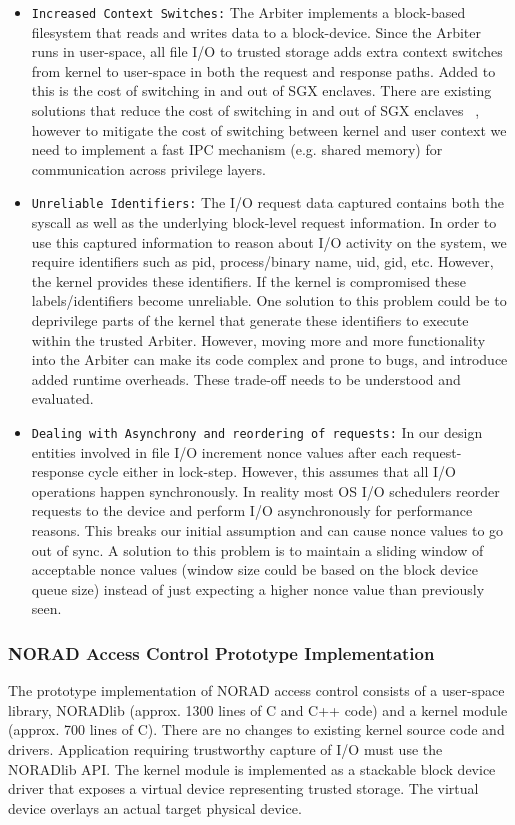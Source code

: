 \documentclass[withindex,glossary]{cam-thesis}
\begin{document}
\begin{itemize}

\item \texttt{Increased Context Switches:}
The Arbiter implements a block-based filesystem that reads and writes data to a block-device.
Since the Arbiter runs in user-space, all file I/O to trusted storage adds extra context switches from kernel to user-space in both the request and response paths.
Added to this is the cost of switching in and out of SGX enclaves.
There are existing solutions that reduce the cost of switching in and out of SGX enclaves ~\cite{hotcalls, eleos}, however to mitigate the cost of switching between kernel and user context we need to implement a fast IPC mechanism (e.g. shared memory) for communication across privilege layers.

\item \texttt{Unreliable Identifiers:}
The I/O request data captured contains both the syscall as well as the underlying block-level request information.
In order to use this captured information to reason about I/O activity on the system, we require identifiers such as pid, process/binary name, uid, gid, etc.
However, the kernel provides these identifiers.
If the kernel is compromised these labels/identifiers become unreliable.
One solution to this problem could be to deprivilege parts of the kernel that generate these identifiers to execute within the trusted Arbiter.
However, moving more and more functionality into the Arbiter can make its code complex and prone to bugs, and introduce added runtime overheads.
These trade-off needs to be understood and evaluated.

\item \texttt{Dealing with Asynchrony and reordering of requests:}
In our design entities involved in file I/O increment nonce values after each request-response cycle either in lock-step.
However, this assumes that all I/O operations happen synchronously.
In reality most OS I/O schedulers reorder requests to the device and perform I/O asynchronously for performance reasons.
This breaks our initial assumption and can cause nonce values to go out of sync.
A solution to this problem is to maintain a sliding window of acceptable nonce values (window size could be based on the block device queue size) instead of just expecting a higher nonce value than previously seen.

\end{itemize}

\subsubsection{NORAD Access Control Prototype Implementation}
The prototype implementation of NORAD access control consists of a user-space library, NORADlib (approx. 1300 lines of C and C++ code) and a kernel module (approx. 700 lines of C).
There are no changes to existing kernel source code and drivers.
Application requiring trustworthy capture of I/O must use the NORADlib API.
The kernel module is implemented as a stackable block device driver that exposes a virtual device representing trusted storage.
The virtual device overlays an actual target physical device.
\end{document}
